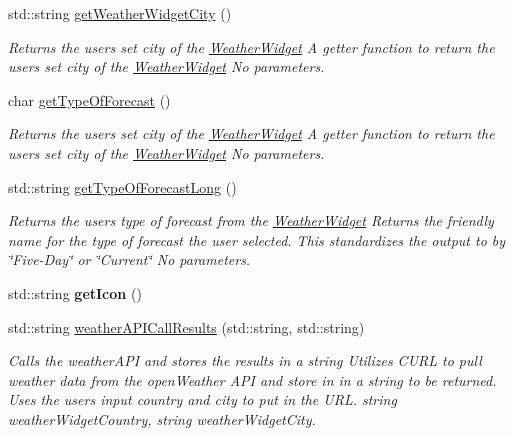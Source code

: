 \begin{DoxyCompactItemize}
std\+::string \mbox{\hyperlink{class_weather_widget_adb2d06c824ce9ad1f3c7a52bbe609177}{get\+Weather\+Widget\+City}} ()
\begin{DoxyCompactList}\small\item\em Returns the user\textquotesingle{}s set city of the \mbox{\hyperlink{class_weather_widget}{Weather\+Widget}}  A getter function to return the user\textquotesingle{}s set city of the \mbox{\hyperlink{class_weather_widget}{Weather\+Widget}}  No parameters. \end{DoxyCompactList}\item 
char \mbox{\hyperlink{class_weather_widget_ad28175371be3fdbcdcbc221e0fd3d926}{get\+Type\+Of\+Forecast}} ()
\begin{DoxyCompactList}\small\item\em Returns the user\textquotesingle{}s set city of the \mbox{\hyperlink{class_weather_widget}{Weather\+Widget}}  A getter function to return the user\textquotesingle{}s set city of the \mbox{\hyperlink{class_weather_widget}{Weather\+Widget}}  No parameters. \end{DoxyCompactList}\item 
std\+::string \mbox{\hyperlink{class_weather_widget_aeb1d38f52ab208d41c1cd52a09780f75}{get\+Type\+Of\+Forecast\+Long}} ()
\begin{DoxyCompactList}\small\item\em Returns the user\textquotesingle{}s type of forecast from the \mbox{\hyperlink{class_weather_widget}{Weather\+Widget}}  Returns the friendly name for the type of forecast the user selected. This standardizes the output to by \char`\"{}\+Five-\/\+Day\char`\"{} or \char`\"{}\+Current\char`\"{}  No parameters. \end{DoxyCompactList}\item 
\mbox{\label{class_weather_widget_ab885c934a45715452fa70fcf4060b061}} 
std\+::string {\bfseries get\+Icon} ()
\item 
std\+::string \mbox{\hyperlink{class_weather_widget_a1d7fc69f16f114b5bcc82b09dbb359cf}{weather\+A\+P\+I\+Call\+Results}} (std\+::string, std\+::string)
\begin{DoxyCompactList}\small\item\em Calls the weather\+A\+PI and stores the results in a string  Utilizes C\+U\+RL to pull weather data from the open\+Weather A\+PI and store in in a string to be returned. Uses the user\textquotesingle{}s input country and city to put in the U\+RL.  string weather\+Widget\+Country, string weather\+Widget\+City. \end{DoxyCompactList}\item 

\end{DoxyCompactItemize}
